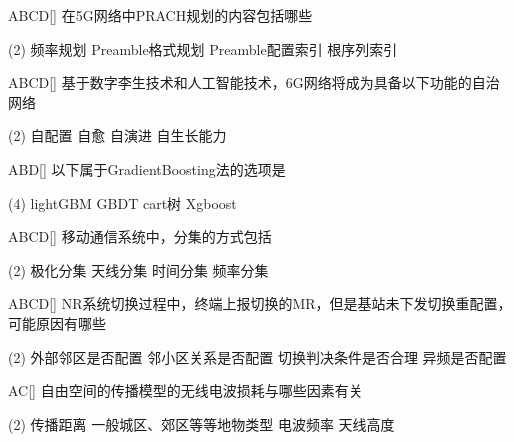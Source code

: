\begin{choice}{\;ABCD\;}[]
    在5G网络中PRACH规划的内容包括哪些
    \begin{tasks}(2)
        \task 频率规划
        \task Preamble格式规划
        \task Preamble配置索引
        \task 根序列索引
    \end{tasks}
\end{choice}

\begin{choice}{\;ABCD\;}[]
    基于数字李生技术和人工智能技术，6G网络将成为具备以下功能的自治网络

    \begin{tasks}(2)
        \task 自配置
        \task 自愈
        \task 自演进
        \task 自生长能力
    \end{tasks}
\end{choice}

\begin{choice}{\;ABD\;}[]
    以下属于GradientBoosting法的选项是
    \begin{tasks}(4)
        \task lightGBM
        \task GBDT
        \task cart树
        \task Xgboost
    \end{tasks}
\end{choice}


\begin{choice}{\;ABCD\;}[]
    移动通信系统中，分集的方式包括
    \begin{tasks}(2)
        \task 极化分集
        \task 天线分集
        \task 时间分集
        \task 频率分集
    \end{tasks}
\end{choice}


\begin{choice}{\;ABCD\;}[]
    NR系统切换过程中，终端上报切换的MR，但是基站未下发切换重配置，可能原因有哪些
    \begin{tasks}(2)
        \task 外部邻区是否配置
        \task 邻小区关系是否配置
        \task 切换判决条件是否合理
        \task 异频是否配置
    \end{tasks}
\end{choice}


\begin{choice}{\;AC\;}[]
    自由空间的传播模型的无线电波损耗与哪些因素有关
    \begin{tasks}(2)
        \task 传播距离
        \task 一般城区、郊区等等地物类型
        \task 电波频率
        \task 天线高度
    \end{tasks}
\end{choice}


